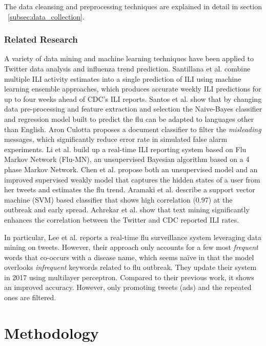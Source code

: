 \documentclass[12pt, oneside]{article}
\begin{document}
The data cleansing and preprocessing techniques are explained in detail in section ~\ref{subsec:data_collection}.

\subsubsection{Related Research}

A variety of data mining and machine learning techniques have been applied to Twitter data analysis and influenza trend prediction.
Santillana et al. \cite{Santillana} combine multiple ILI activity estimates into a single prediction of ILI using machine learning ensemble approaches,
which produces accurate weekly ILI predictions for up to four weeks ahead of CDC's ILI reports. Santos et al. \cite{Santos} show that by changing data pre-processing and
feature extraction and selection the Naive-Bayes classifier and regression model built to predict the flu can be adapted to languages other than English.
Aron Culotta \cite{Culotta} proposes a document classifier to filter the \textit{misleading} messages, which significantly reduce error rate in simulated false alarm experiments.
Li et al. \cite{Li} build up a real-time ILI reporting system based on Flu Markov Network (Flu-MN), an unsupervised Bayesian algorithm based on a 4 phase Markov Network.
Chen et al. \cite{Chen} propose both an unsupervised model and an improved supervised weakly model that captures the hidden states of a user from her tweets
and estimates the flu trend. Aramaki et al. \cite{Aramaki} describe a support vector machine (SVM) based classifier that shows high correlation (0.97)
at the outbreak and early spread. Achrekar et al. \cite{TwitterSeasonalFlu} show that text mining significantly enhances the correlation between the Twitter and CDC reported ILI rates.

In particular, Lee et al. \cite{TwitterSurveillance} reports a real-time flu surveillance system leveraging data mining on tweets. However, their approach only accounts for
a few most \textit{frequent} words that co-occurs with a disease name, which seems na\"{i}ve in that the model overlooks \textit{infrequent} keywords related to flu outbreak.
They update their system in 2017 \cite{TwitterNNs} using multilayer perceptron. Compared to their previous work, it shows an improved accuracy.
However, only promoting tweets (ads) and the repeated ones are filtered.




\section{Methodology}
\label{sec:methodology}
\end{document}
